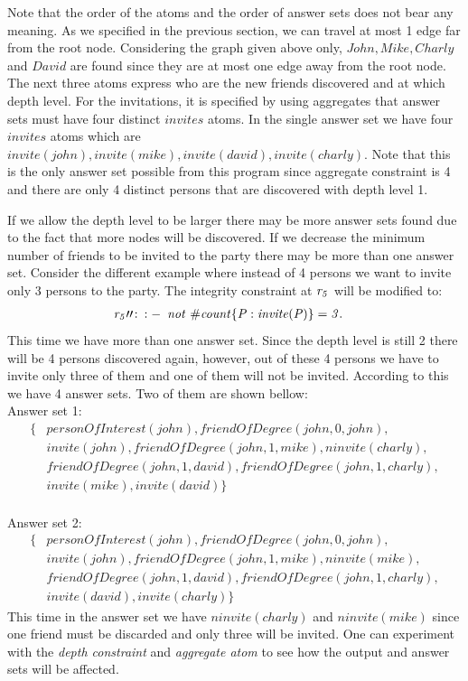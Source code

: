 \documentclass[a4paper, titlepage]{article}
\DeclareMathOperator{\leftimpl}{:-}
\newcommand{\row}[1]{%
  \ensuremath{\it \color{black} #1 \color{black}}%
}
\begin{document}
Note that the order of the atoms and the order of answer sets 
does not bear any meaning. As we specified in the previous 
section, we can travel at most 1 edge far from the root 
node. Considering the graph given above only, $\mathit{John, 
Mike, Charly}$ and $\mathit{David}$ are found since they 
are at most one edge away from the root node. The next three atoms 
express who are the new friends discovered and at which 
depth 
level. For the invitations, it is specified by using 
aggregates that answer sets must have four distinct 
$\mathit{invites}$ atoms.
In the single answer set we have four $\mathit{invites}$ atoms 
which are $\mathit{invite(john), 
invite(mike), invite(david), invite(charly)}$. Note that 
this is the only answer set possible 
from this program since aggregate constraint is 4 and there 
are only 4 distinct persons that are discovered with depth 
level 1. 

If we allow the depth level to be larger there may be more 
answer sets found due to the fact that more nodes will be 
discovered. If we decrease the minimum number of friends to be 
invited to the party there may be more than one answer set. 
Consider the different example where instead of 4 
persons we want to invite only 3 persons to the party. 
The integrity constraint at $\row{r_5}$ will be modified to:
\begin{align*}
& \row{r_5} \prime \prime \colon \leftimpl \ \mathit{ not } \  \mathit{\#count} \{ P : \mathit{invite(P)} \} = 3.
\end{align*} 
 This time we have more than one answer set. Since the depth 
 level is still 2 there will be 4 persons discovered again, 
 however, out of these 4 persons we have to invite only 
 three of them and one of them will not be invited. 
 According to this we have 4 answer sets. Two of them are 
 shown bellow:\\
Answer set 1:
\begin{align*}
   \{ &\mathit{personOfInterest(john), 
      friendOfDegree(john,0,john),}\\
      &\mathit{invite(john), friendOfDegree(john,1,mike), 
      \mathit{ninvite(charly)},}\\
      &\mathit{friendOfDegree(john,1,david), 
      friendOfDegree(john,1,charly),}\\
      &\mathit{invite(mike),invite(david)}  \}
 \end{align*}
\\ Answer set 2:
 \begin{align*}
   \{&\mathit{personOfInterest(john), 
   friendOfDegree(john,0,john),} \\
   &\mathit{invite(john), friendOfDegree(john,1,mike), 
   \mathit{ninvite(mike)},}\\
   &\mathit{friendOfDegree(john,1,david), 
   friendOfDegree(john,1,charly),} \\
   &\mathit{invite(david),invite(charly)}\}
 \end{align*}
 This time in the answer set we have 
$\mathit{ninvite(charly)}$ and $\mathit{ninvite(mike)}$ 
since one friend must be discarded and only three will be 
invited. One can experiment with the \emph{depth constraint} and 
\emph{aggregate atom} to see how the output and 
answer sets will be affected.    
\end{document}
